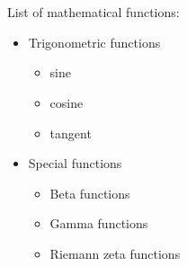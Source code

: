 \documentclass[10pt,a4paper]{article}
\begin{document}
\section*{}
List of mathematical functions:
\begin{itemize}
    \item Trigonometric functions
    \begin{itemize}
        \item[-] sine
        \item[-] cosine
        \item[-] tangent
    \end{itemize}
    \item Special functions
    \begin{itemize}
        \item[-] Beta functions
        \item[-] Gamma functions
        \item[-] Riemann zeta functions
    \end{itemize}
\end{itemize}
\end{document}
